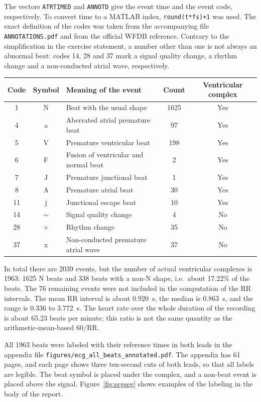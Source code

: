 The vectors \texttt{ATRTIMED} and \texttt{ANNOTD} give the event time and the event code, respectively. To convert time to a MATLAB index, \texttt{round(t*fs)+1} was used. The exact definition of the codes was taken from the accompanying file \texttt{ANNOTATIONS.pdf} and from the official WFDB reference. Contrary to the simplification in the exercise statement, a number other than one is not always an abnormal beat: codes 14, 28 and 37 mark a signal quality change, a rhythm change and a non-conducted atrial wave, respectively.

\begin{center}
\begin{tabularx}{\textwidth}{@{}cc>{\raggedright\arraybackslash}Xcc@{}}
\toprule
\textbf{Code} & \textbf{Symbol} & \textbf{Meaning of the event} & \textbf{Count} & \textbf{Ventricular complex}\\
\midrule
1  & N & Beat with the usual shape & 1625 & Yes\\
4  & a & Aberrated atrial premature beat & 97 & Yes\\
5  & V & Premature ventricular beat & 198 & Yes\\
6  & F & Fusion of ventricular and normal beat & 2 & Yes\\
7  & J & Premature junctional beat & 1 & Yes\\
8  & A & Premature atrial beat & 30 & Yes\\
11 & j & Junctional escape beat & 10 & Yes\\
14 & $\sim$ & Signal quality change & 4 & No\\
28 & + & Rhythm change & 35 & No\\
37 & x & Non-conducted premature atrial wave & 37 & No\\
\bottomrule
\end{tabularx}
\end{center}

In total there are 2039 events, but the number of actual ventricular complexes is 1963: 1625 N beats and 338 beats with a non-N shape, i.e.\ about 17.22\% of the beats. The 76 remaining events were not included in the computation of the RR intervals. The mean RR interval is about 0.920~s, the median is 0.863~s, and the range is 0.336 to 3.772~s. The heart rate over the whole duration of the recording is about 65.23 beats per minute; this ratio is not the same quantity as the arithmetic-mean-based $60/\mathrm{RR}$.

All 1963 beats were labeled with their reference times in both leads in the appendix file \texttt{figures/ecg\_all\_beats\_annotated.pdf}. The appendix has 61 pages, and each page shows three ten-second cuts of both leads, so that all labels are legible. The beat symbol is placed under the complex, and a non-beat event is placed above the signal. Figure~\ref{fig:ecgseg} shows examples of the labeling in the body of the report.

